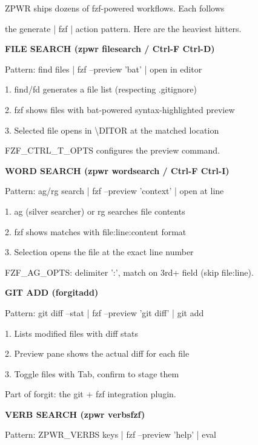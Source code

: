 \documentclass[11pt,a4paper,twoside]{book}
\begin{document}
ZPWR ships dozens of fzf-powered workflows. Each follows

the generate | fzf | action pattern. Here are the heaviest hitters.


\vspace{12pt}
{\bfseries\color{neonyellow} FILE SEARCH (zpwr filesearch / Ctrl-F Ctrl-D)}\vspace{4pt}

Pattern: find files | fzf --preview 'bat' | open in editor

1. find/fd generates a file list (respecting .gitignore)

2. fzf shows files with bat-powered syntax-highlighted preview

3. Selected file opens in \textbackslash{}DITOR at the matched location

FZF\_CTRL\_T\_OPTS configures the preview command.


\vspace{12pt}
{\bfseries\color{neonyellow} WORD SEARCH (zpwr wordsearch / Ctrl-F Ctrl-I)}\vspace{4pt}

Pattern: ag/rg search | fzf --preview 'context' | open at line

1. ag (silver searcher) or rg searches file contents

2. fzf shows matches with file:line:content format

3. Selection opens the file at the exact line number

FZF\_AG\_OPTS: delimiter ':', match on 3rd+ field (skip file:line).


\vspace{12pt}
{\bfseries\color{neonyellow} GIT ADD (forgitadd)}\vspace{4pt}

Pattern: git diff --stat | fzf --preview 'git diff' | git add

1. Lists modified files with diff stats

2. Preview pane shows the actual diff for each file

3. Toggle files with Tab, confirm to stage them

Part of forgit: the git + fzf integration plugin.


\vspace{12pt}
{\bfseries\color{neonyellow} VERB SEARCH (zpwr verbsfzf)}\vspace{4pt}

Pattern: ZPWR\_VERBS keys | fzf --preview 'help' | eval
\end{document}
